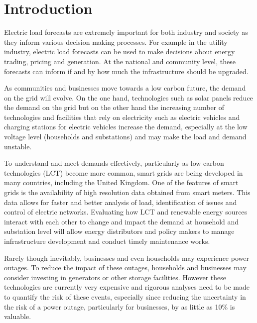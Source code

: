 
\chapter{Introduction}

Electric load forecasts are extremely important for both industry and society as they inform various decision making processes. For example in the utility industry, electric load forecasts can be used to make decisions about energy trading, pricing and generation. At the national and community level, these forecasts can inform if and by how much the infrastructure should be upgraded.

As communities and businesses move towards a low carbon future, the demand on the grid will evolve. On the one hand, technologies such as solar panels reduce the demand on the grid but on the other hand the increasing number of technologies and facilities that rely on electricity such as electric vehicles and charging stations for electric vehicles increase the demand, especially at the low voltage level (households and substations) and may make the load and demand unstable. 

To understand and meet demands effectively, particularly as low carbon technologies (LCT) become more common, smart grids are being developed in many countries, including the United Kingdom. One of the features of smart grids is the availability of high resolution data obtained from smart meters. This data allows for faster and better analysis of load, identification of issues and control of electric networks. Evaluating how LCT and renewable energy sources interact with each other to change and impact the demand at household and substation level will allow energy distributors and policy makers to manage infrastructure development and conduct timely maintenance works.

Rarely though inevitably, businesses and even households may experience power outages. To reduce the impact of these outages, households and businesses may consider investing in generators or other storage facilities. However these technologies are currently very expensive and rigorous analyses need to be made to quantify the risk of these events, especially since reducing the uncertainty in the risk of a power outage, particularly for businesses, by as little as 10\% is valuable.


